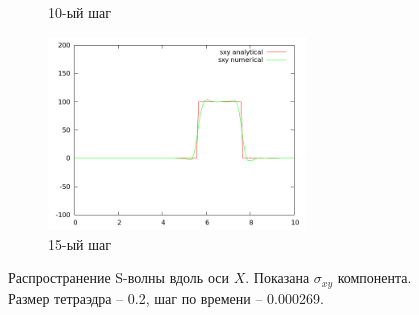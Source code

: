 \begin{figure}[H]
\begin{subfigure}[b]{0.5\textwidth}
\caption{10-ый шаг}
\end{subfigure}
\begin{subfigure}[b]{0.5\textwidth}
\centering
\includegraphics[width=0.75\textwidth]{png/veryfication/0.2/s-wave-along-x15.png}
\caption{15-ый шаг}
\end{subfigure}
\caption{Распространение S-волны вдоль оси $X$. Показана $\sigma_{xy}$ компонента. Размер тетраэдра -- 0.2, шаг по времени -- 0.000269. }
\label{pic:s_wave_along_x2}
\end{figure}

